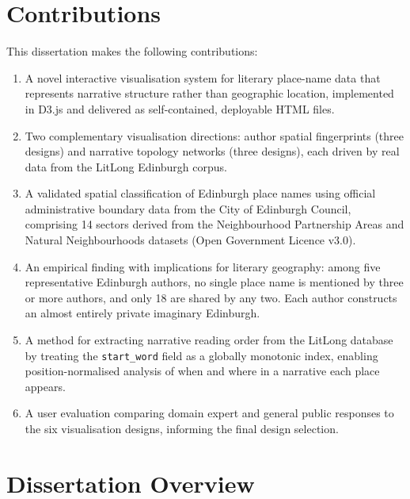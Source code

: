 \documentclass[logo,msc]{infthesis}
\begin{document}
\section{Contributions}
 
This dissertation makes the following contributions:
 
\begin{enumerate}[leftmargin=*, label=\arabic*.]
  \item A novel interactive visualisation system for literary place-name data that represents narrative structure rather than geographic location, implemented in D3.js and delivered as self-contained, deployable HTML files.
 
  \item Two complementary visualisation directions: author spatial fingerprints (three designs) and narrative topology networks (three designs), each driven by real data from the LitLong Edinburgh corpus.
 
  \item A validated spatial classification of Edinburgh place names using official administrative boundary data from the City of Edinburgh Council, comprising 14 sectors derived from the Neighbourhood Partnership Areas and Natural Neighbourhoods datasets (Open Government Licence v3.0).
 
  \item An empirical finding with implications for literary geography: among five representative Edinburgh authors, no single place name is mentioned by three or more authors, and only 18 are shared by any two. Each author constructs an almost entirely private imaginary Edinburgh.
 
  \item A method for extracting narrative reading order from the LitLong database by treating the \texttt{start\_word} field as a globally monotonic index, enabling position-normalised analysis of when and where in a narrative each place appears.
 
  \item A user evaluation comparing domain expert and general public responses to the six visualisation designs, informing the final design selection.
\end{enumerate}
 
\section{Dissertation Overview}
 
\end{document}
